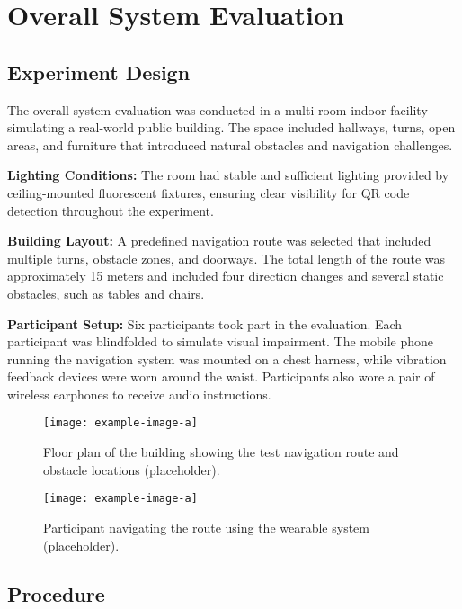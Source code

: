 \section{Overall System Evaluation}

\subsection{Experiment Design}

The overall system evaluation was conducted in a multi-room indoor facility simulating a real-world public building. The space included hallways, turns, open areas, and furniture that introduced natural obstacles and navigation challenges.

\textbf{Lighting Conditions:}  
The room had stable and sufficient lighting provided by ceiling-mounted fluorescent fixtures, ensuring clear visibility for QR code detection throughout the experiment.

\textbf{Building Layout:}  
A predefined navigation route was selected that included multiple turns, obstacle zones, and doorways. The total length of the route was approximately 15 meters and included four direction changes and several static obstacles, such as tables and chairs.

\textbf{Participant Setup:}  
Six participants took part in the evaluation. Each participant was blindfolded to simulate visual impairment. The mobile phone running the navigation system was mounted on a chest harness, while vibration feedback devices were worn around the waist. Participants also wore a pair of wireless earphones to receive audio instructions.

\begin{figure}[h]
	\centering
	\texttt{[image: example-image-a]}
	\caption{Floor plan of the building showing the test navigation route and obstacle locations (placeholder).}
	\label{fig:building_layout}
\end{figure}

\begin{figure}[h]
	\centering
	\texttt{[image: example-image-a]}
	\caption{Participant navigating the route using the wearable system (placeholder).}
	\label{fig:overall_experiment_procedure}
\end{figure}

\subsection{Procedure}

